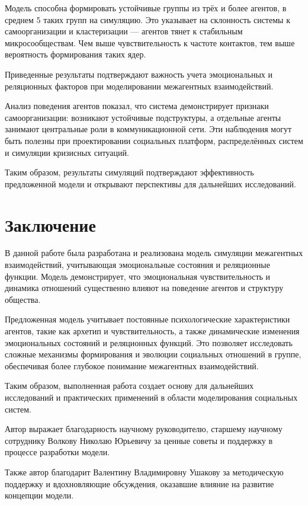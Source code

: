 \documentclass[12pt]{article}
\begin{document}
\newpage

Модель способна формировать устойчивые группы из трёх и более агентов, в среднем 5 таких групп на симуляцию.  
Это указывает на склонность системы к самоорганизации и кластеризации — агентов тянет к стабильным микросообществам.  
Чем выше чувствительность к частоте контактов, тем выше вероятность формирования таких ядер.

Приведенные результаты подтверждают важность учета эмоциональных и реляционных факторов при моделировании межагентных взаимодействий.

Анализ поведения агентов показал, что система демонстрирует признаки самоорганизации: возникают устойчивые подструктуры, а отдельные агенты занимают центральные роли в коммуникационной сети. Эти наблюдения могут быть полезны при проектировании социальных платформ, распределённых систем и симуляции кризисных ситуаций.

Таким образом, результаты симуляций подтверждают эффективность предложенной модели и открывают перспективы для дальнейших исследований.

\section{Заключение}

В данной работе была разработана и реализована модель симуляции межагентных взаимодействий, учитывающая эмоциональные состояния и реляционные функции. Модель демонстрирует, что эмоциональная чувствительность и динамика отношений существенно влияют на поведение агентов и структуру общества.

Предложенная модель учитывает постоянные психологические характеристики агентов, такие как архетип и чувствительность, а также динамические изменения эмоциональных состояний и реляционных функций. Это позволяет исследовать сложные механизмы формирования и эволюции социальных отношений в группе, обеспечивая более глубокое понимание межагентных взаимодействий.

Таким образом, выполненная работа создает основу для дальнейших исследований и практических применений в области моделирования социальных систем.

Автор выражает благодарность научному руководителю, старшему научному сотруднику Волкову Николаю Юрьевичу за ценные советы и поддержку в процессе разработки модели.

Также автор благодарит Валентину Владимировну Ушакову за методическую поддержку и вдохновляющие обсуждения, оказавшие влияние на развитие концепции модели.
\end{document}
